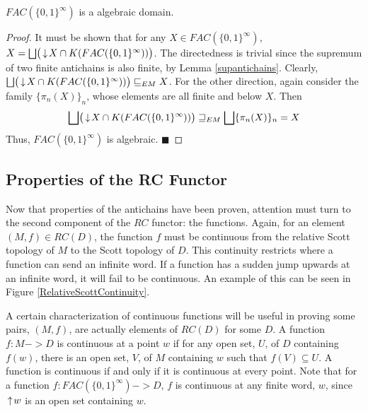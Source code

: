 \begin{proposition}
$FAC(\{0,1\}^\infty)$ is a algebraic domain.
\end{proposition}
\begin{proof}
It must be shown that for any $X\in FAC(\{0,1\}^\infty)$, $X = \bigsqcup \bigl(\,\downarrow\! X \cap K(FAC(\{0,1\}^\infty))\bigr)$.  The directedness is trivial since the supremum of two finite antichains is also finite, by Lemma \ref{supantichains}.  Clearly, $\bigsqcup \bigl(\,\downarrow\! X \cap K(FAC(\{0,1\}^\infty))\bigr) \sqsubseteq_{EM} X$.  For the other direction, again consider the family $\{\pi_n(X)\}_n$, whose elements are all finite and below $X$. Then \[\bigsqcup \bigl(\,\downarrow\! X \cap K(FAC(\{0,1\}^\infty))\bigr) \sqsupseteq_{EM} \bigsqcup \{\pi_n(X)\}_n = X\]  Thus, $FAC(\{0,1\}^\infty)$ is algebraic. \hfill $\blacksquare$
\end{proof}

\subsection{Properties of the RC Functor}

Now that properties of the antichains have been proven, attention must turn to the second component of the $RC$ functor:  the functions.  Again, for an element $(M,f) \in RC(D)$, the function $f$ must be continuous from the relative Scott topology of $M$ to the Scott topology of $D$.  This continuity restricts where a function can send an infinite word.  If a function has a sudden jump upwards at an infinite word, it will fail to be continuous.  An example of this can be seen in Figure \ref{RelativeScottContinuity}.

A certain characterization of continuous functions will be useful in proving some pairs, $(M,f)$, are actually elements of $RC(D)$ for some $D$.  A function $f:M->D$ is continuous at a point $w$ if for any open set, $U$, of $D$ containing $f(w)$, there is an open set, $V$, of $M$ containing $w$ such that $f(V) \subseteq U$.  A function is continuous if and only if it is continuous at every point.  Note that for a function $f:FAC(\{0,1\}^\infty) -> D$, $f$ is continuous at any finite word, $w$, since $\,\uparrow\! w$ is an open set containing $w$.

